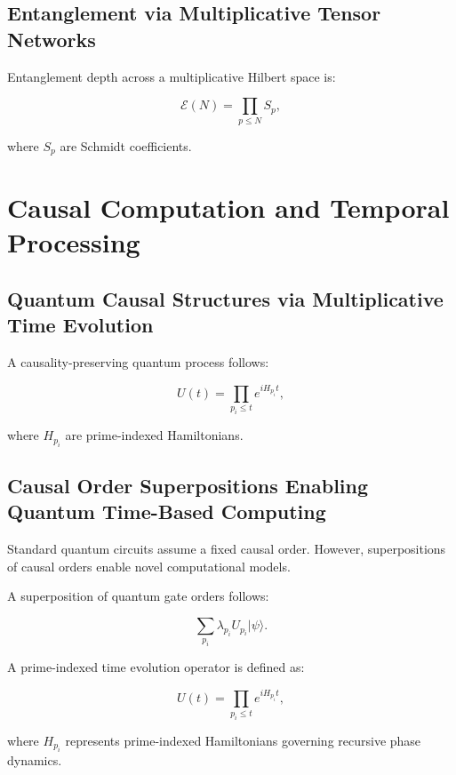 \documentclass{article}
\theoremstyle{plain}
\begin{document}
\begin{itemize}
\begin{itemize}
\subsection{Entanglement via Multiplicative Tensor Networks}
Entanglement depth across a multiplicative Hilbert space is:

\begin{equation}
\mathcal{E}(N) = \prod_{p \leq N} S_p,
\end{equation}

where \( S_p \) are Schmidt coefficients.

\section{Causal Computation and Temporal Processing}

\subsection{Quantum Causal Structures via Multiplicative Time Evolution}
A causality-preserving quantum process follows:

\begin{equation}
U(t) = \prod_{p_i \leq t} e^{i H_{p_i} t},
\end{equation}

where \( H_{p_i} \) are prime-indexed Hamiltonians.

\subsection{Causal Order Superpositions Enabling Quantum Time-Based Computing}

Standard quantum circuits assume a fixed causal order. However, superpositions of causal orders enable novel computational models.

A superposition of quantum gate orders follows:

\begin{equation}
\sum_{p_i} \lambda_{p_i} U_{p_i} |\psi\rangle.
\end{equation}

A prime-indexed time evolution operator is defined as:

\begin{equation}
U(t) = \prod_{p_i \leq t} e^{i H_{p_i} t},
\end{equation}

where \( H_{p_i} \) represents prime-indexed Hamiltonians governing recursive phase dynamics.


\end{itemize}
\end{itemize}
\end{document}
